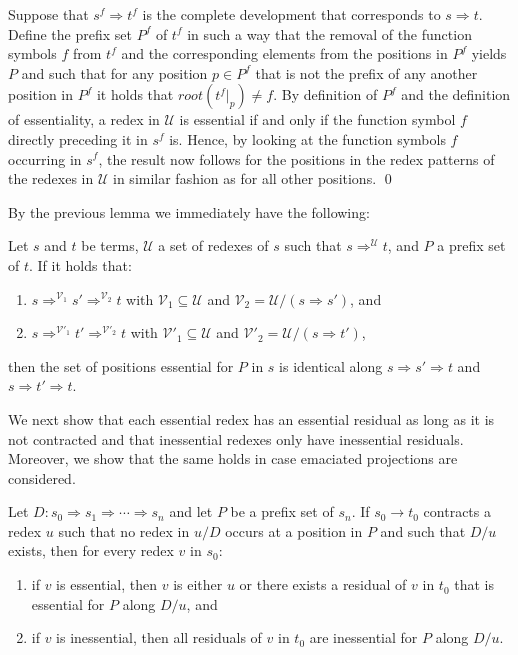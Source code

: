 \documentclass{LMCS}
\theoremstyle{definition}
\newcommand{\rew}{\rightarrow}
\newcommand{\rs}[1]{root(#1)}
\newcommand{\dev}{\Rightarrow}
\begin{document}
Suppose that $s^f \dev t^f$ is the complete development that corresponds to $s \dev t$. Define the prefix set $P^f$ of $t^f$ in such a way that the removal of the function symbols $f$ from $t^f$ and the corresponding elements from the positions in $P^f$ yields $P$ and such that for any position $p \in P^f$ that is not the prefix of any another position in $P^f$ it holds that $\rs{t^f|_p} \not = f$. By definition of $P^f$ and the definition of essentiality, a redex in $\mathcal{U}$ is essential if and only if the function symbol $f$ directly preceding it in $s^f$ is. Hence, by looking at the function symbols $f$ occurring in $s^f$, the result now follows for the positions in the redex patterns of the redexes in $\mathcal{U}$ in similar fashion as for all other positions.
\qed

By the previous lemma we immediately have the following:
\begin{cor}
\label{cor:devsplit}
Let $s$ and $t$ be terms, $\mathcal{U}$ a set of redexes of $s$ such that $s \dev^\mathcal{U} t$, and $P$ a prefix set of $t$. If it holds that:
\begin{enumerate}[$\bullet$]
\item
$s \dev^{\mathcal{V}_1} s' \dev^{\mathcal{V}_2} t$ with $\mathcal{V}_1 \subseteq \mathcal{U}$ and $\mathcal{V}_2 = \mathcal{U}/(s \dev s')$, and
\item
$s \dev^{\mathcal{V}'_1} t' \dev^{\mathcal{V}'_2} t$ with $\mathcal{V}'_1 \subseteq \mathcal{U}$ and $\mathcal{V}'_2 = \mathcal{U}/(s \dev t')$,
\end{enumerate}
then the set of positions essential for $P$ in $s$ is identical along $s \dev s' \dev t$ and $s \dev t' \dev t$.
\end{cor}

We next show that each essential redex has an essential residual as long as it is not contracted and that inessential redexes only have inessential residuals. Moreover, we show that the same holds in case emaciated projections are considered.

\begin{lem}
\label{lem:essstaysess_prim}
Let $D: s_0 \dev s_1 \dev \cdots \dev s_n$ and let $P$ be a prefix set of $s_n$. If $s_0 \rew t_0$ contracts a redex $u$ such that no redex in $u/D$ occurs at a position in $P$ and such that $D/u$ exists, then for every redex $v$ in $s_0$:
\begin{enumerate}[$\bullet$]
\item
if $v$ is essential, then $v$ is either $u$ or there exists a residual of $v$ in $t_0$ that is essential for $P$ along $D/u$, and
\item
if $v$ is inessential, then all residuals of $v$ in $t_0$ are inessential for $P$ along $D/u$.
\end{enumerate}
\end{lem}
\end{document}
